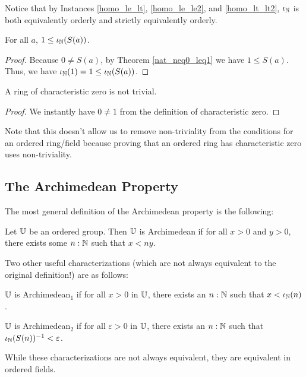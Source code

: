 \documentclass[../../math.tex]{subfiles}
\begin{document}
Notice that by Instances \ref{homo_le_lt}, \ref{homo_le_le2}, and
\ref{homo_lt_lt2}, $\iota_{\mathbb{N}}$ is both equivalently orderly and strictly equivalently
orderly.

\begin{theorem} \label{from_nat_pos1}
    For all $a$, $1 \leq \iota_{\mathbb{N}}(S(a))$.
\end{theorem}
\begin{proof}
    Because $0 \neq S(a)$, by Theorem \ref{nat_neq0_leq1} we have $1 \leq S(a)$.
    Thus, we have $\iota_{\mathbb{N}}(1) = 1 \leq \iota_{\mathbb{N}}(S(a))$.
\end{proof}

\begin{instance}
    A ring of characteristic zero is not trivial.
\end{instance}
\begin{proof}
    We instantly have $0 \neq 1$ from the definition of characteristic zero.
\end{proof}
\noindent Note that this doesn't allow us to remove non-triviality from the
conditions for an ordered ring/field because proving that an ordered ring has
characteristic zero uses non-triviality.

\subsection{The Archimedean Property}

The most general definition of the Archimedean property is the following:

\begin{class}
    Let $\mathbb{U}$ be an ordered group.  Then $\mathbb{U}$ is Archimedean if for all $x > 0$
    and $y > 0$, there exists some $n : \mathbb{N}$ such that $x < ny$.
\end{class}

Two other useful characterizations (which are not always equivalent to the
original definition!) are as follows:

\begin{definition}
    $\mathbb{U}$ is Archimedean$_1$ if for all $x > 0$ in $\mathbb{U}$, there exists an $n : \mathbb{N}$
    such that $x < \iota_{\mathbb{N}}(n)$.
\end{definition}

\begin{definition}
    $\mathbb{U}$ is Archimedean$_2$ if for all $\varepsilon > 0$ in $\mathbb{U}$, there exists
    an $n : \mathbb{N}$ such that $\iota_{\mathbb{N}}(S(n))^{-1} < \varepsilon$.
\end{definition}

While these characterizations are not always equivalent, they are equivalent in
ordered fields.
\end{document}
